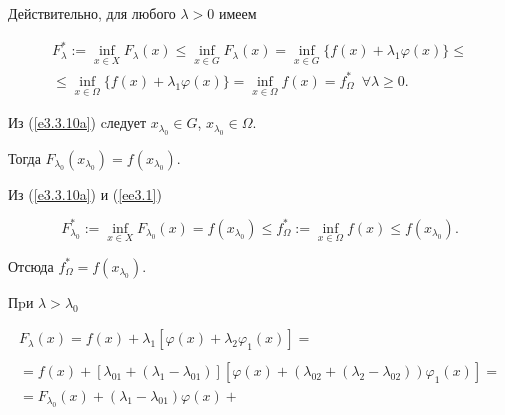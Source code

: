 \begin{pf}


Действительно, для любого $\lambda >0$ имеем


\begin{multline}\label{ee3.1}


F^{*}_{\lambda}:= \inf\limits_{x\in


X}F_{\lambda}(x)\leq


\inf_{x\in G} F_\lambda(x)=\inf_{x\in G} \{f(x)+\lambda_1\varphi(x)\}\leq\\


\leq \inf_{x\in \Omega} \{f(x)+\lambda_1\varphi(x)\}=


\inf\limits_{x\in\Omega}f(x) =


f^{*}_{\Omega}\ \; \forall\lambda\geq 0.


\end{multline}


Из (\ref{e3.3.10a}) cледует $x_{\lambda_0}\in G$, $x_{\lambda_0}\in \Omega$.


Тогда $F_{\lambda_0}(x_{\lambda_0})=f(x_{\lambda_0})$.


Из (\ref{e3.3.10a}) и (\ref{ee3.1})


$$




F^{*}_{\lambda_0}:= \inf\limits_{x\in


X}F_{\lambda_0}(x)=f(x_{\lambda_0})\leq f^*_\Omega:=


\inf\limits_{x\in \Omega}f(x)\leq f(x_{\lambda_0}).




$$


Отсюда $f^{*}_{\Omega}=f(x_{\lambda_0})$.





Пpи $\lambda>\lambda_0$


\begin{multline}\label{ee3.2}


F_\lambda(x)=f(x)+\lambda_1[\varphi(x)+\lambda_2\varphi_1(x)]= \\


\\=f(x)+[\lambda_{01}+(\lambda_1-\lambda_{01})][\varphi(x)+


(\lambda_{02}+(\lambda_2-\lambda_{02}))\varphi_1(x)]=\\


=F_{\lambda_0}(x)+(\lambda_1-\lambda_{01})\varphi(x)+



\end{multline}
\end{pf}
